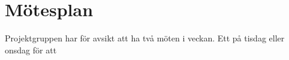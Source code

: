 \section{Mötesplan}

Projektgruppen har för avsikt att ha två möten i veckan. Ett på tisdag eller onsdag för att 